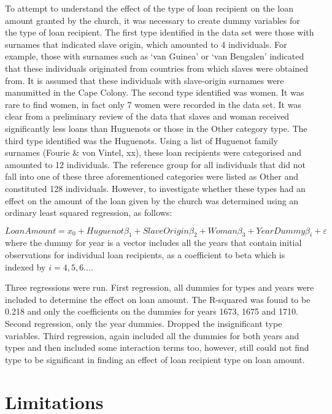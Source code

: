 \documentclass[11pt,preprint, authoryear]{elsarticle}
\numberwithin{equation}{section}
\numberwithin{figure}{section}
\numberwithin{table}{section}
\begin{document}
To attempt to understand the effect of the type of loan recipient on the
loan amount granted by the church, it was necessary to create dummy
variables for the type of loan recipient. The first type identified in
the data set were those with surnames that indicated slave origin, which
amounted to 4 individuals. For example, those with surnames such as `van
Guinea' or `van Bengalen' indicated that these individuals originated
from countries from which slaves were obtained from. It is assumed that
these individuals with slave-origin surnames were manumitted in the Cape
Colony. The second type identified was women. It was rare to find women,
in fact only 7 women were recorded in the data set. It was clear from a
preliminary review of the data that slaves and woman received
significantly less loans than Huguenots or those in the Other category
type. The third type identified was the Huguenots. Using a list of
Huguenot family surnames (Fourie \& von Vintel, xx), these loan
recipients were categorised and amounted to 12 individuals. The
reference group for all individuals that did not fall into one of these
three aforementioned categories were listed as Other and constituted 128
individuals. However, to investigate whether these types had an effect
on the amount of the loan given by the church was determined using an
ordinary least squared regression, as follows:

\[
LoanAmount = x_0 + Huguenot \beta_1 + SlaveOrigin \beta_2 + Woman \beta_3 + YearDummy \beta_i + \varepsilon
\] where the dummy for year is a vector includes all the years that
contain initial observations for individual loan recipients, as a
coefficient to beta which is indexed by \(i=4, 5, 6...\).

Three regressions were run. First regression, all dummies for types and
years were included to determine the effect on loan amount. The
R-squared was found to be 0.218 and only the coefficients on the dummies
for years 1673, 1675 and 1710. Second regression, only the year dummies.
Dropped the insignificant type variables. Third regression, again
included all the dummies for both years and types and then included some
interaction terms too, however, still could not find type to be
significant in finding an effect of loan recipient type on loan amount.

\hypertarget{limitations}{%
\section{\texorpdfstring{Limitations
\label{Limitations}}{Limitations }}\label{limitations}}
\end{document}
